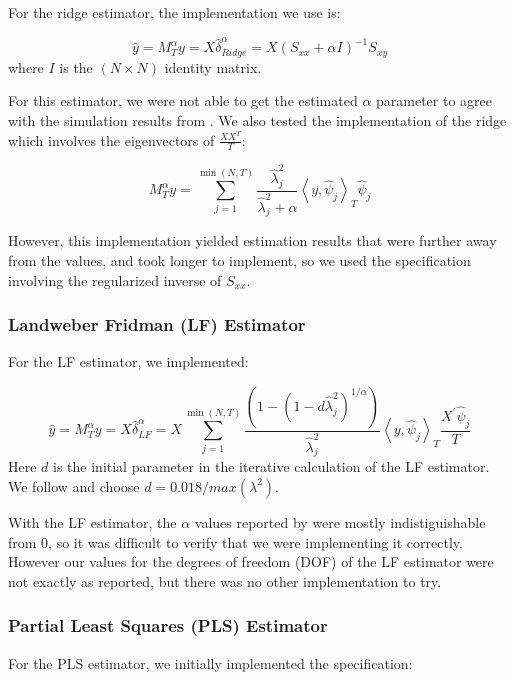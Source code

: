 For the ridge estimator, the implementation we use is:

\[\widehat{y} = M_{T}^{\alpha} y = X \hat{\delta}_{Ridge}^{\alpha} = X (S_{xx} + \alpha I)^{-1} S_{xy}\]
where $I$ is the $(N \times N)$ identity matrix.

For this estimator, we were not able to get the estimated $\alpha$ parameter to agree with the simulation results from \citeauthor{carrasco2016sample}. We also tested the implementation of the ridge which involves the eigenvectors of $\frac{X X^{T}}{T}$:

\[M_{T}^{\alpha} y = \sum_{j=1}^{\min (N, T)} \frac{\hat{\lambda}_{j}^{2}}{\hat{\lambda}_{j}^{2}+\alpha}\left\langle y, \hat{\psi}_{j}\right\rangle_{T} \hat{\psi}_{j}\]

However, this implementation yielded estimation results that were further away from the \citeauthor{carrasco2016sample} values, and took longer to implement, so we used the specification involving the regularized inverse of $S_{xx}$.

\subsubsection{Landweber Fridman (LF) Estimator}

For the LF estimator, we implemented:

\[\widehat{y} = M_{T}^{\alpha} y = X \hat{\delta}_{LF}^{\alpha} = X \sum_{j=1}^{\min (N, T)} \frac{\left(1-\left(1-d \widehat{\lambda}_{j}^{2}\right)^{1 / \alpha}\right)}{\widehat{\lambda}_{j}^{2}}\left\langle y, \hat{\psi}_{j}\right\rangle_{T} \frac{X^{\prime} \hat{\psi}_{j}}{T}\]
Here $d$ is the initial parameter in the iterative calculation of the LF estimator. We follow \citeauthor{carrasco2016sample} and choose $d = 0.018/max(\lambda^2)$.

With the LF estimator, the $\alpha$ values reported by \citeauthor{carrasco2016sample} were mostly indistiguishable from 0, so it was difficult to verify that we were implementing it correctly. However our values for the degrees of freedom (DOF) of the LF estimator were not exactly as reported, but there was no other implementation to try.

\subsubsection{Partial Least Squares (PLS) Estimator}

For the PLS estimator, we initially implemented the specification:

